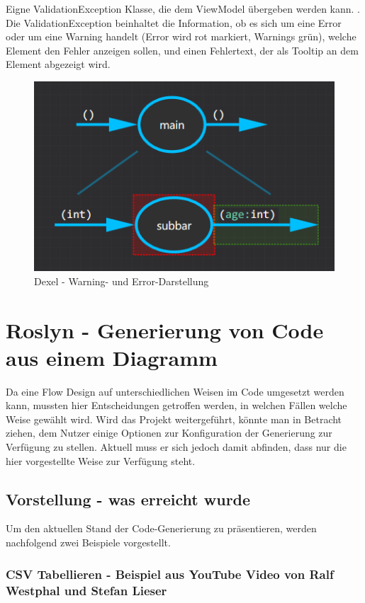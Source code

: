 Eigne ValidationException Klasse, die dem ViewModel übergeben werden kann. .
Die ValidationException beinhaltet die Information, ob es sich um eine Error oder um eine Warning handelt (Error wird rot markiert, Warnings grün), welche  Element den Fehler anzeigen sollen, und einen Fehlertext, der als Tooltip an dem Element abgezeigt wird.

\begin{figure}[H]
	\centering
	\includegraphics[width=0.6\linewidth]{./img/DexelValidation.png}
	\caption{Dexel - Warning- und Error-Darstellung}
\end{figure}



\section{Roslyn - Generierung von Code aus einem Diagramm}

Da eine Flow Design auf unterschiedlichen Weisen im Code umgesetzt werden
kann, mussten hier Entscheidungen getroffen werden, in welchen Fällen
welche Weise gewählt wird. Wird das Projekt weitergeführt, könnte man in
Betracht ziehen, dem Nutzer einige Optionen zur Konfiguration der Generierung
zur Verfügung zu stellen. Aktuell muss er sich jedoch damit abfinden, dass nur die hier vorgestellte Weise zur Verfügung steht.


\subsection{Vorstellung - was erreicht wurde}

Um den aktuellen Stand der Code-Generierung zu präsentieren, werden nachfolgend zwei Beispiele 
vorgestellt.

\subsubsection{CSV Tabellieren -  Beispiel aus YouTube Video von Ralf Westphal und Stefan Lieser}

